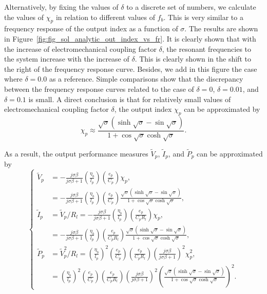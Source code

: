 \documentclass{article}
\begin{document}
Alternatively, by fixing the values of $\delta$ to a discrete set of numbers, we calculate the values of $\chi_p$ in relation to different values of $f_b$. This is very similar to a frequency response of the output index as a function of $\sigma$. The results are shown in Figure~\ref{fig:fig_sol_analytic_out_index_vs_fr}. It is clearly shown that with the increase of electromechanical coupling factor $\delta$, the resonant frequencies to the system increase with the increase of $\delta$. This is clearly shown in the shift to the right of the frequency response curve. Besides, we add in this figure the case where $\delta = 0.0$ as a reference. Simple comparisons show that the discrepancy between the frequency response curves related to the case of $\delta = 0$, $\delta=0.01$, and $\delta = 0.1$ is small. A direct conclusion is that for relatively small values of electromechanical coupling factor $\delta$, the output index $\chi_p$ can be approximated by 
\begin{equation}
    \chi_p \approx \frac{ \sqrt{\sigma} \left( \sinh\sqrt{\sigma} - \sin\sqrt{\sigma} \right) }{ 1 + \cos\sqrt{\sigma } \cosh\sqrt{\sigma } }.
\end{equation}

As a result, the output performance measures $\tilde{V}_p$, $\tilde{I}_p$, and $\tilde{P}_p$ can be approximated by 
\begin{equation}
    \left\{\begin{aligned}
        \tilde{V}_p &= - \frac{j \sigma \beta}{j \sigma \beta + 1} \left(\frac{\eta_b}{l_p}\right) \left(\frac{e_p}{C_p}\right) \chi_p , \\
        &= - \frac{j \sigma \beta}{j \sigma \beta + 1} \left(\frac{\eta_b}{l_p}\right) \left(\frac{e_p}{C_p}\right) \frac{ \sqrt{\sigma} \left( \sinh\sqrt{\sigma} - \sin\sqrt{\sigma} \right) }{ 1 + \cos\sqrt{\sigma } \cosh\sqrt{\sigma } } , \\
        \tilde{I}_p &=  \tilde{V}_p / R_l = - \frac{ j \sigma \beta } {j \sigma \beta + 1} \left( \frac{\eta_b}{l_p} \right) \left( \frac{e_p}{C_p R_l} \right) \chi_p , \\
        &= - \frac{ j \sigma \beta } {j \sigma \beta + 1} \left( \frac{\eta_b}{l_p} \right) \left( \frac{e_p}{C_p R_l} \right) \frac{ \sqrt{\sigma} \left( \sinh\sqrt{\sigma} - \sin\sqrt{\sigma} \right) }{ 1 + \cos\sqrt{\sigma } \cosh\sqrt{\sigma } }, \\
        \tilde{P}_p &=  \tilde{V}_p^2 / R_l = \left(\frac{\eta_b}{l_p}\right)^2 \left(\frac{e_p}{C_p}\right) \left( \frac{e_p}{C_p R_l} \right) \left( \frac{ j \sigma \beta}{ j \sigma \beta + 1 } \right)^2 \chi_p^2, \\
        &= \left(\frac{\eta_b}{l_p}\right)^2 \left(\frac{e_p}{C_p}\right) \left( \frac{e_p}{C_p R_l} \right) \left( \frac{ j \sigma \beta}{ j \sigma \beta + 1 } \right)^2 \left( \frac{ \sqrt{\sigma} \left( \sinh\sqrt{\sigma} - \sin\sqrt{\sigma} \right) }{ 1 + \cos\sqrt{\sigma } \cosh\sqrt{\sigma } } \right)^2.
    \end{aligned}\right.
    \label{eq:eq_peh_perfs_compact_form_approx}
\end{equation}
\end{document}
